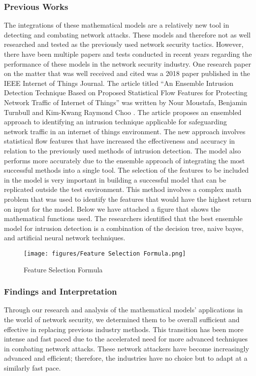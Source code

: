 \documentclass{article}
\begin{document}
\subsubsection{Previous Works}
The integrations of these mathematical models are a relatively new tool in detecting and combating network attacks. These models and therefore not as well researched and tested as the previously used network security tactics. However, there have been multiple papers and tests conducted in recent years regarding the performance of these models in the network security industry. 
One research paper on the matter that was well received and cited was a 2018 paper published in the IEEE Internet of Things Journal. The article titled “An Ensemble Intrusion Detection Technique Based on Proposed Statistical Flow Features for Protecting Network Traffic of Internet of Things” was written by Nour Moustafa, Benjamin Turnbull and Kim-Kwang Raymond Choo \cite{moustafa2018ensemble}. The article proposes an ensembled approach to identifying an intrusion technique applicable for safeguarding network traffic in an internet of things environment. The new approach involves statistical flow features that have increased the effectiveness and accuracy in relation to the previously used methods of intrusion detection. The model also performs more accurately due to the ensemble approach of integrating the most successful methods into a single tool. The selection of the features to be included in the model is very important in building a successful model that can be replicated outside the test environment. This method involves a complex math problem that was used to identify the features that would have the highest return on input for the model. Below we have attached a figure that shows the mathematical functions used. The researchers identified that the best ensemble model for intrusion detection is a combination of the decision tree, naive bayes, and artificial neural network techniques. 

\begin{figure}
    \centering
    \texttt{[image: figures/Feature Selection Formula.png]}
    \caption{Feature Selection Formula}
\end{figure}

\subsubsection{Findings and Interpretation}
Through our research and analysis of the mathematical models’ applications in the world of network security, we determined them to be overall sufficient and effective in replacing previous industry methods. This transition has been more intense and fast paced due to the accelerated need for more advanced techniques in combating network attacks. These network attackers have become increasingly advanced and efficient; therefore, the industries have no choice but to adapt at a similarly fast pace. 
\end{document}
